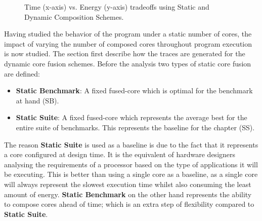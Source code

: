 \begin{figure}[t]
     \caption{Time (x-axis) vs. Energy (y-axis) tradeoffs using Static and Dynamic Composition Schemes.}
     \label{fig:paretos}
	 	 	 	 \vspace{1em}

\end{figure}

Having studied the behavior of the program under a static number of cores, the impact of varying the number of composed cores throughout program execution is now studied.
The section first describe how the traces are generated for the dynamic core fusion schemes.
Before the analysis two types of static core fusion are defined:
\begin{itemize}
	\item \textbf{Static Benchmark}: A fixed fused-core which is optimal for the benchmark at hand (SB).
\vspace{-1.2em}
	\item \textbf{Static Suite}: A fixed fused-core which represents the average best for the entire suite of benchmarks. This represents the baseline for the chapter (SS).
\end{itemize}

The reason \textbf{Static Suite} is used as a baseline is due to the fact that it represents a core configured at design time.
It is the equivalent of hardware designers analysing the requirements of a processor based on the type of applications it will be executing.
This is better than using a single core as a baseline, as a single core will always represent the slowest execution time whilst also consuming the least amount of energy.
\textbf{Static Benchmark} on the other hand represents the ability to compose cores ahead of time; which is an extra step of flexibility compared to \textbf{Static Suite}.

